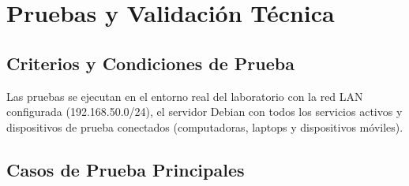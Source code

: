 \documentclass[12pt,a4paper]{report}
\begin{document}
\newpage
\section{Pruebas y Validación Técnica}

\subsection{Criterios y Condiciones de Prueba}

Las pruebas se ejecutan en el entorno real del laboratorio con la red LAN configurada (192.168.50.0/24), el servidor Debian con todos los servicios activos y dispositivos de prueba conectados (computadoras, laptops y dispositivos móviles).

\subsection{Casos de Prueba Principales}
\end{document}
